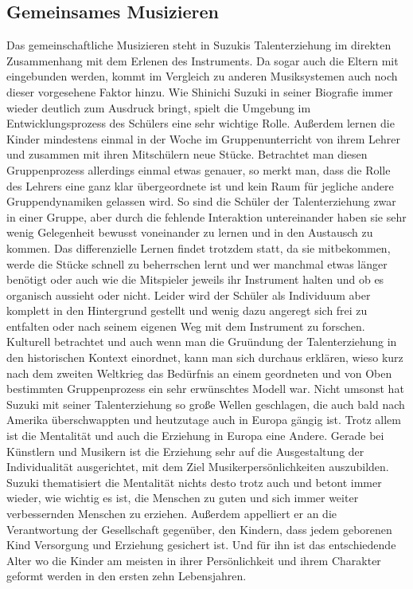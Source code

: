 \subsection{Gemeinsames Musizieren}
Das gemeinschaftliche Musizieren steht in Suzukis Talenterziehung im direkten
Zusammenhang mit dem Erlenen des Instruments. Da sogar auch die Eltern mit
eingebunden werden, kommt im Vergleich zu anderen Musiksystemen auch noch dieser
vorgesehene Faktor hinzu. Wie Shinichi Suzuki in seiner Biografie immer wieder
deutlich zum Ausdruck bringt, spielt die Umgebung im Entwicklungsprozess des
Schülers eine sehr wichtige Rolle. Außerdem lernen die Kinder mindestens einmal in der
Woche im Gruppenunterricht von ihrem Lehrer und zusammen mit ihren Mitschülern
neue Stücke. Betrachtet man diesen Gruppenprozess allerdings einmal etwas
genauer, so merkt man, dass die Rolle des Lehrers eine ganz klar übergeordnete
ist und kein Raum für jegliche andere Gruppendynamiken gelassen wird. So sind
die Schüler der Talenterziehung zwar in einer Gruppe, aber durch die fehlende
Interaktion untereinander haben sie sehr wenig Gelegenheit bewusst voneinander
zu lernen und in den Austausch zu kommen. Das differenzielle Lernen findet
trotzdem statt, da sie mitbekommen, werde die Stücke schnell zu beherrschen
lernt und wer manchmal etwas länger benötigt oder auch wie die Mitspieler
jeweils ihr Instrument halten und ob es organisch aussieht oder nicht.
Leider wird der Schüler als Individuum aber komplett in den Hintergrund gestellt
und wenig dazu angeregt sich frei zu entfalten oder nach seinem eigenen Weg mit
dem Instrument zu forschen. Kulturell betrachtet und auch wenn man die Gruündung
der Talenterziehung in den historischen Kontext einordnet, kann man sich
durchaus erklären, wieso kurz nach dem zweiten Weltkrieg das Bedürfnis an einem
geordneten und von Oben bestimmten Gruppenprozess ein sehr erwünschtes Modell
war. Nicht umsonst hat Suzuki mit seiner Talenterziehung so große Wellen
geschlagen, die auch bald nach Amerika überschwappten und heutzutage auch in
Europa gängig ist. Trotz allem ist die Mentalität und auch die Erziehung in
Europa eine Andere. Gerade bei Künstlern und Musikern ist die Erziehung sehr auf die Ausgestaltung der
Individualität ausgerichtet, mit dem Ziel Musikerpersönlichkeiten auszubilden.
Suzuki thematisiert die Mentalität nichts desto trotz auch und betont immer
wieder, wie wichtig es ist, die Menschen zu guten und sich immer weiter
verbessernden Menschen zu erziehen. Außerdem appelliert er an die Verantwortung
der Gesellschaft gegenüber, den Kindern, dass jedem geborenen Kind Versorgung
und Erziehung gesichert ist. \autocite[130]{suzuki:erziehung_ist_liebe}
Und für ihn ist das entschiedende Alter wo die Kinder am meisten in ihrer
Persönlichkeit und ihrem Charakter geformt werden
in den ersten zehn Lebensjahren. 


